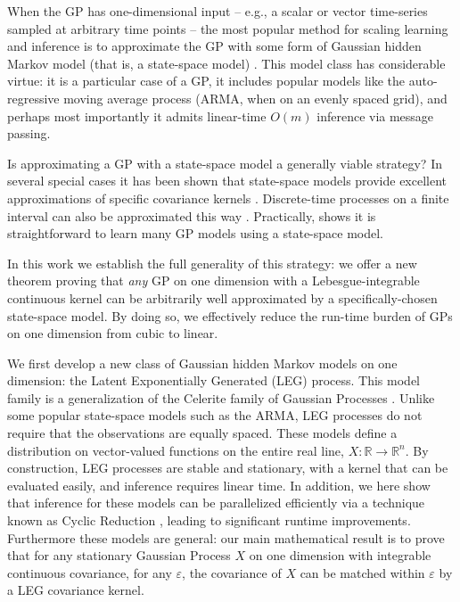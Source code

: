 \documentclass{article}
\theoremstyle{definition}
\begin{document}
When the GP has one-dimensional input -- e.g., 
a scalar or vector time-series sampled at arbitrary time points -- the most popular method for scaling learning and inference is to approximate the GP with some form of Gaussian hidden Markov model (that is, a state-space model) \cite{reinsel2003elements,mergner2009applications,cheung2010estimation,brockwell2013time}.  This model class has considerable virtue: it is a particular case of a GP, it includes popular models like the auto-regressive moving average process (ARMA, when on an evenly spaced grid), and perhaps most importantly it admits linear-time $O(m)$ inference via message passing.

Is approximating a GP with a state-space model a generally viable strategy?
In several special cases it has been shown that state-space models provide excellent approximations of specific covariance kernels 
\cite{karvonen2016approximate,benavoli2016state}.  Discrete-time processes on a finite interval can also be approximated this way \cite{lindgren2011explicit}.  Practically, \cite{gilboa2013scaling} shows it is straightforward to learn many GP models using a state-space model. 

In this work we establish the full generality of this strategy: we offer a new theorem proving that \emph{any} GP on one dimension with a Lebesgue-integrable continuous kernel can be arbitrarily well approximated by a specifically-chosen state-space model.  By doing so, we effectively reduce the run-time burden of  GPs on one dimension from cubic to linear.

We first develop a new class of Gaussian hidden Markov models on one dimension: the Latent Exponentially Generated (LEG) process.  This model family is a generalization of the Celerite family of Gaussian Processes \cite{foreman2017celerite}.  Unlike some popular state-space models such as the ARMA, LEG 
processes do not require that the observations are equally spaced.  These models define a distribution on vector-valued functions on the entire real line, $X: \mathbb{R} \rightarrow \mathbb{R}^n$.  By construction, LEG processes are stable and stationary, with a kernel that can be evaluated easily, and
inference requires linear time.  In addition, we here show that inference for these models can be parallelized efficiently via a technique known as Cyclic Reduction \cite{sweet1974generalized}, leading to significant runtime improvements.  Furthermore these models are general: our main mathematical result is to prove that for any stationary Gaussian Process $X$ on one dimension with integrable continuous covariance, for any $\varepsilon$, the covariance of $X$ can be matched within $\varepsilon$ by a 
LEG covariance kernel. 
\end{document}

